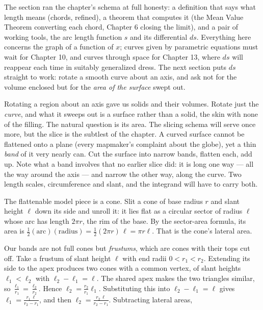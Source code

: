 \documentclass[a4paper,12pt,oneside]{memoir}
\begin{document}
The section ran the chapter’s schema at full honesty: a definition that says what length means (chords, refined), a theorem that computes it (the Mean Value Theorem converting each chord, Chapter 6 closing the limit), and a pair of working tools, the arc length function \(s\) and its differential \(ds\). Everything here concerns the graph of a function of \(x\); curves given by parametric equations must wait for Chapter 10, and curves through space for Chapter 13, where \(ds\) will reappear each time in suitably generalized dress. The next section puts \(ds\) straight to work: rotate a smooth curve about an axis, and ask not for the volume enclosed but for the \emph{area of the surface} swept out.


Rotating a region about an axis gave us solids and their volumes. Rotate just the \emph{curve}, and what it sweeps out is a surface rather than a solid, the skin with none of the filling. The natural question is its area. The slicing schema will serve once more, but the slice is the subtlest of the chapter. A curved surface cannot be flattened onto a plane (every mapmaker’s complaint about the globe), yet a thin \emph{band} of it very nearly can. Cut the surface into narrow bands, flatten each, add up. Note what a band involves that no earlier slice did: it is long one way — all the way around the axis — and narrow the other way, along the curve. Two length scales, circumference and slant, and the integrand will have to carry both.

The flattenable model piece is a cone. Slit a cone of base radius \(r\) and slant height \(\ell\) down its side and unroll it: it lies flat as a circular sector of radius \(\ell\) whose arc has length \(2\pi r\), the rim of the base. By the sector-area formula, its area is \(\tfrac{1}{2}(\text{arc})(\text{radius}) = \tfrac{1}{2}(2\pi r)\,\ell = \pi r \ell\). That is the cone’s lateral area.

Our bands are not full cones but \emph{frustums}, which are cones with their tops cut off. Take a frustum of slant height \(\ell\) with end radii \(0 < r_1 < r_2\). Extending its side to the apex produces two cones with a common vertex, of slant heights \(\ell_1 < \ell_2\) with \(\ell_2 - \ell_1 = \ell\). The shared apex makes the two triangles similar, so \(\tfrac{\ell_1}{r_1} = \tfrac{\ell_2}{r_2}\). Hence \(\ell_2 = \tfrac{r_2}{r_1}\ell_1\). Substituting this into \(\ell_2 - \ell_1 = \ell\) gives \(\ell_1 = \tfrac{r_1\,\ell}{r_2 - r_1}\), and then \(\ell_2 = \tfrac{r_2\,\ell}{r_2 - r_1}\). Subtracting lateral areas,
\end{document}
